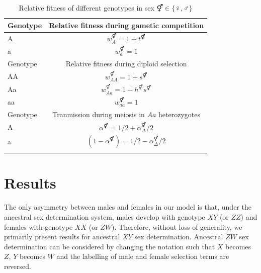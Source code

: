 \documentclass[12pt]{article}
\begin{document}
\begin{table}[ht]
\centering
\smallskip
\caption{Relative fitness of different genotypes in sex $\Hermaphrodite \in \{\female,\male\}$}
\begin{tabular}{l c }
\hline\hline
  Genotype & Relative fitness during gametic competition \\ [0.5ex] \hline
  A & $w_{A}^\Hermaphrodite = 1+t^\Hermaphrodite$ \\
  a & $w_{a}^\Hermaphrodite = 1$ \\ [0.5ex] \hline
  Genotype & Relative fitness during diploid selection \\ [0.5ex] \hline
  AA & $w_{AA}^\Hermaphrodite = 1+ s^\Hermaphrodite$ \\
  Aa & $w_{Aa}^\Hermaphrodite = 1+h^\Hermaphrodite s^\Hermaphrodite$ \\
  aa & $w_{aa}^\Hermaphrodite = 1$ \\ [0.5ex] \hline
  Genotype & Tranmission during meiosis in $Aa$ heterozygotes \\ [0.5ex] \hline
  A & $\alpha^\Hermaphrodite=1/2+\alpha_{\Delta}^{\Hermaphrodite}/2$ \\
  a & $(1-\alpha^\Hermaphrodite)=1/2-\alpha_{\Delta}^{\Hermaphrodite}/2$ \\
  \hline \hline
  \label{tab:fitnesstable}
 \end{tabular}
\end{table}


\section*{Results}

The only asymmetry between males and females in our model is that, under the ancestral sex determination system, males develop with genotype $XY$ (or $ZZ$) and females with genotype $XX$ (or $ZW$). 
Therefore, without loss of generality, we primarily present results for ancestral $XY$ sex determination. 
Ancestral $ZW$ sex determination can be considered by changing the notation such that $X$ becomes $Z$, $Y$ becomes $W$ and the labelling of male and female selection terms are reversed. 
\end{document}
